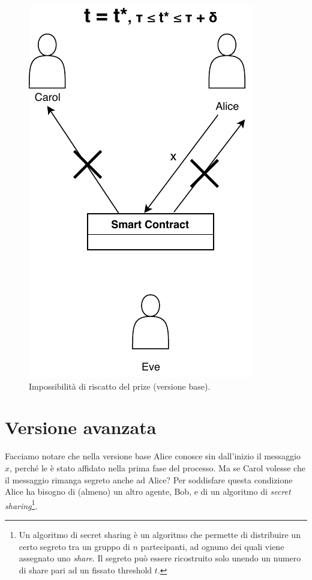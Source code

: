 \begin{figure}[H]
\begin{minipage}{0.4\textwidth}
		\includegraphics[width=.7\linewidth]{images/chap_protocollo/base-leak-2.pdf}
		\caption{Impossibilità di riscatto del prize (versione base).}
	\end{minipage}
\end{figure}

\section{Versione avanzata}
Facciamo notare che nella versione base
Alice conosce sin
dall'inizio il messaggio
$ x $, perché le è stato affidato nella prima fase del processo.
Ma se Carol volesse che il messaggio rimanga segreto anche ad Alice?
Per soddisfare questa condizione Alice ha bisogno di (almeno) un altro agente,
Bob, e di un
algoritmo di \textit{secret sharing}\footnote{Un algoritmo di secret sharing
	è un algoritmo che permette di
	distribuire un certo segreto tra un gruppo di $ n $ partecipanti, ad ognuno dei quali viene
	assegnato uno \textit{share}. Il segreto può essere ricostruito solo unendo un numero di share
	pari ad un fissato threshold $ t $.}.


